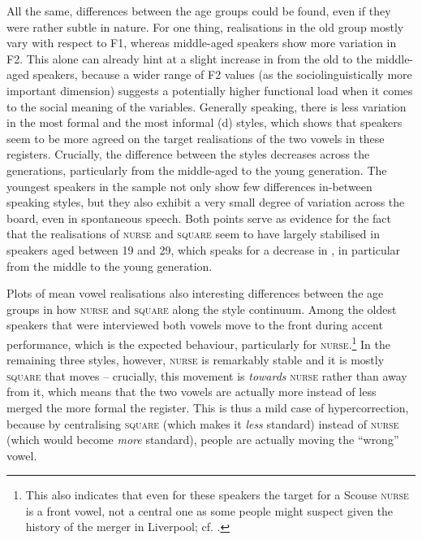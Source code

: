 All the same, differences between the age groups could be found, even if they were rather subtle in nature.
For one thing, realisations in the old group mostly vary with respect to F1, whereas middle-aged speakers show more variation in F2.
This alone can already hint at a slight increase in  from the old to the middle-aged speakers, because a wider range of F2 values (as the sociolinguistically more important dimension) suggests a potentially higher functional load when it comes to the social meaning of the variables.
Generally speaking, there is less variation in the most formal and the most informal (d) styles, which shows that speakers seem to be more agreed on the target realisations of the two vowels in these registers.
Crucially, the difference between the styles decreases across the generations, particularly from the middle-aged to the young generation.
The youngest speakers in the sample not only show few differences in-between speaking styles, but they also exhibit a very small degree of variation across the board, even in spontaneous speech.
Both points serve as evidence for the fact that the realisations of \textsc{nurse} and \textsc{square} seem to have largely stabilised in speakers aged between 19 and 29, which speaks for a decrease in , in particular from the middle to the young generation.

\largerpage
Plots of mean vowel realisations also  interesting differences between the age groups in how \textsc{nurse} and \textsc{square}  along the style continuum.
Among the oldest speakers that were interviewed both vowels move to the front during accent performance, which is the expected behaviour, particularly for \textsc{nurse}.\footnote{This also indicates that even for these speakers the target for a Scouse \textsc{nurse} is a front vowel, not a central one as some people might suspect given the history of the merger in Liverpool; cf. .}
In the remaining three styles, however, \textsc{nurse} is remarkably stable and it is mostly \textsc{square} that moves -- crucially, this movement is \emph{towards} \textsc{nurse} rather than away from it, which means that the two vowels are actually more instead of less merged the more formal the register.
This is thus a mild case of hypercorrection, because by centralising \textsc{square} (which makes it \emph{less} standard) instead of \textsc{nurse} (which would become \emph{more} standard), people are actually moving the ``wrong'' vowel.

